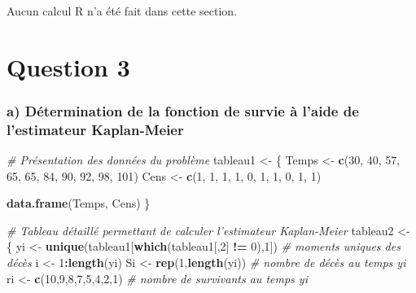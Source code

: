 \documentclass[]{article}
\newenvironment{Shaded}{\begin{snugshade}}{\end{snugshade}}
\newcommand{\KeywordTok}[1]{\textcolor[rgb]{0.13,0.29,0.53}{\textbf{#1}}}
\newcommand{\DecValTok}[1]{\textcolor[rgb]{0.00,0.00,0.81}{#1}}
\newcommand{\StringTok}[1]{\textcolor[rgb]{0.31,0.60,0.02}{#1}}
\newcommand{\CommentTok}[1]{\textcolor[rgb]{0.56,0.35,0.01}{\textit{#1}}}
\newcommand{\OperatorTok}[1]{\textcolor[rgb]{0.81,0.36,0.00}{\textbf{#1}}}
\newcommand{\NormalTok}[1]{#1}
\begin{document}
Aucun calcul R n'a été fait dans cette section.

\newpage

\section{Question 3}\label{question-3-1}

\subsubsection{a) Détermination de la fonction de survie à l'aide de
l'estimateur
Kaplan-Meier}\label{a-determination-de-la-fonction-de-survie-a-laide-de-lestimateur-kaplan-meier-1}

\begin{Shaded}
\begin{Highlighting}[]
\CommentTok{# Présentation des données du problème}
\NormalTok{tableau1 <-}\StringTok{ }\NormalTok{\{}
\NormalTok{    Temps <-}\StringTok{ }\KeywordTok{c}\NormalTok{(}\DecValTok{30}\NormalTok{, }\DecValTok{40}\NormalTok{, }\DecValTok{57}\NormalTok{, }\DecValTok{65}\NormalTok{, }\DecValTok{65}\NormalTok{, }\DecValTok{84}\NormalTok{, }\DecValTok{90}\NormalTok{, }\DecValTok{92}\NormalTok{, }\DecValTok{98}\NormalTok{, }\DecValTok{101}\NormalTok{) }
\NormalTok{    Cens <-}\StringTok{ }\KeywordTok{c}\NormalTok{(}\DecValTok{1}\NormalTok{, }\DecValTok{1}\NormalTok{, }\DecValTok{1}\NormalTok{, }\DecValTok{1}\NormalTok{, }\DecValTok{0}\NormalTok{, }\DecValTok{1}\NormalTok{, }\DecValTok{1}\NormalTok{, }\DecValTok{0}\NormalTok{, }\DecValTok{1}\NormalTok{, }\DecValTok{1}\NormalTok{)}

    \KeywordTok{data.frame}\NormalTok{(Temps, Cens)}
\NormalTok{\} }

\CommentTok{# Tableau détaillé permettant de calculer l'estimateur Kaplan-Meier}
\NormalTok{tableau2 <-}\StringTok{ }\NormalTok{\{}
\NormalTok{    yi <-}\StringTok{ }\KeywordTok{unique}\NormalTok{(tableau1[}\KeywordTok{which}\NormalTok{(tableau1[,}\DecValTok{2}\NormalTok{] }\OperatorTok{!=}\StringTok{ }\DecValTok{0}\NormalTok{),}\DecValTok{1}\NormalTok{])    }\CommentTok{# moments uniques des décès}
\NormalTok{    i <-}\StringTok{ }\DecValTok{1}\OperatorTok{:}\KeywordTok{length}\NormalTok{(yi) }
\NormalTok{    Si <-}\StringTok{ }\KeywordTok{rep}\NormalTok{(}\DecValTok{1}\NormalTok{,}\KeywordTok{length}\NormalTok{(yi))                             }\CommentTok{# nombre de décès au temps yi}
\NormalTok{    ri <-}\StringTok{ }\KeywordTok{c}\NormalTok{(}\DecValTok{10}\NormalTok{,}\DecValTok{9}\NormalTok{,}\DecValTok{8}\NormalTok{,}\DecValTok{7}\NormalTok{,}\DecValTok{5}\NormalTok{,}\DecValTok{4}\NormalTok{,}\DecValTok{2}\NormalTok{,}\DecValTok{1}\NormalTok{)                           }\CommentTok{# nombre de survivants au temps yi}
    

\end{Highlighting}
\end{Shaded}
\end{document}
